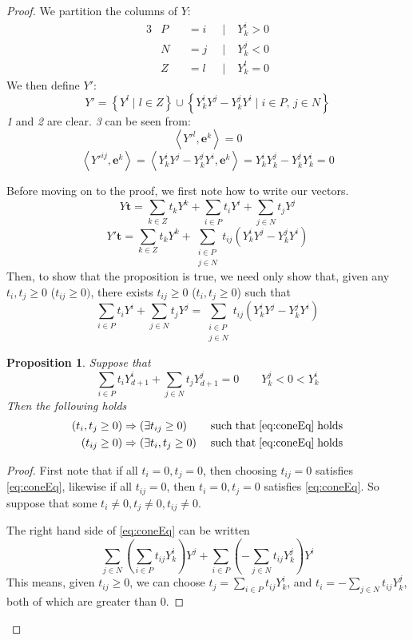 \documentclass[fleqn]{article}
\renewcommand{\vec}[1]{\mathbf{#1}}
\newcommand{\set}[1]{\left\{#1\right\}}
\newcommand{\ip}[2]{\left\langle #1, #2 \right\rangle}
\newcommand{\0}{\vec{0}}
\newcommand{\e}{\vec{e}}
\renewcommand{\t}{\vec{t}}
\newcommand{\st}{\;|\;}
\newcommand{\Yi}{Y^i_{k}}
\newcommand{\Yj}{Y^j_{k}}
\newcommand{\Yl}{Y^l_{k}}
\newcommand{\Psum}{\sum_{i\in P}}
\newcommand{\Nsum}{\sum_{j\in N}}
\newcommand{\Zsum}{\sum_{k\in Z}}
\newcommand{\NPsum}{\sum_{\substack{i\in P \\ j\in N}}}
\newtheorem{Prop}{Proposition}
\begin{document}
\begin{proof}
We partition the columns of $ Y$:
  \begin{alignat*}{3}
  &P &&= i \;&\st &\Yi > 0 \\
  &N &&= j \;&\st &\Yj < 0 \\
  &Z &&= l \;&\st &\Yl = 0
  \end{alignat*}
We then define $ Y'$:
\[  Y' = \set{ Y^l \st l \in Z} \cup 
          \set{\Yi Y^j - \Yj Y^i \st i \in P,\, j\in N} \]
\textit{1} and \textit{2} are clear.  \textit{3} can be seen from:
  \[ \ip{Y'^l}{\e^k} = 0 \]
  \begin{equation}\label{eq:vdropZrows}
  \ip{Y'^{ij}}{\e^k} = \ip{\Yi Y^j - \Yj Y^i}{\e^k} = \Yi \Yj - \Yj \Yi = 0
  \end{equation}

Before moving on to the proof, we first note how to write our vectors.
\[  Y\t = \Zsum t_k  Y^k + \Psum t_i  Y^i + \Nsum t_j  Y^j \]
\[  Y'\t = \Zsum t_k  Y^k + \NPsum t_{ij} (\Yi Y^j - \Yj Y^i) \]
Then, to show that the proposition is true, we need only show that, given any $t_i, t_j \geq 0$ ($t_{ij} \geq 0)$, there exists $t_{ij} \geq 0$ ($t_i, t_j \geq 0$) such that
\begin{equation} \label{eq:coneEq}
  \Psum t_i  Y^i + \Nsum t_j  Y^j = \NPsum t_{ij} (\Yi Y^j - \Yj Y^i)
\end{equation}
\begin{Prop}{
  Suppose that 
  \[ \Psum t_i  Y^i_{d+1} + \Nsum t_j  Y^j_{d+1} = 0\quad\quad \Yj < 0 < \Yi \]
  Then the following holds
\begin{alignat*}{2} 
(t_i, t_j \geq 0)& \Rightarrow (\exists t_{ij} \geq 0)
                       && \mathrm{\;such\; that\; \eqref{eq:coneEq}\; holds}  \\
(t_{ij} \geq 0)& \Rightarrow (\exists t_i, t_j \geq 0)
                       && \mathrm{\;such\; that\; \eqref{eq:coneEq}\; holds}
\end{alignat*}
}\end{Prop}
\begin{proof}
First note that if all $t_i = 0,t_j = 0$, then choosing $t_{ij} = 0$ satisfies \eqref{eq:coneEq}, likewise if all $t_{ij} = 0$, then $t_i = 0, t_j = 0$ satisfies \eqref{eq:coneEq}.  So suppose that some $t_i \neq 0, t_j \neq 0, t_{ij} \neq 0$.

The right hand side of \eqref{eq:coneEq} can be written
\[ \Nsum \left(\Psum t_{ij}\Yi\right) Y^j + 
   \Psum \left(-\Nsum t_{ij}\Yj\right) Y^i \]
This means, given $t_{ij} \geq 0$, we can choose $t_j = \Psum t_{ij}\Yi$, and $t_i = -\Nsum t_{ij}\Yj$, both of which are greater than $0$.


\end{proof}
\end{proof}
\end{document}
